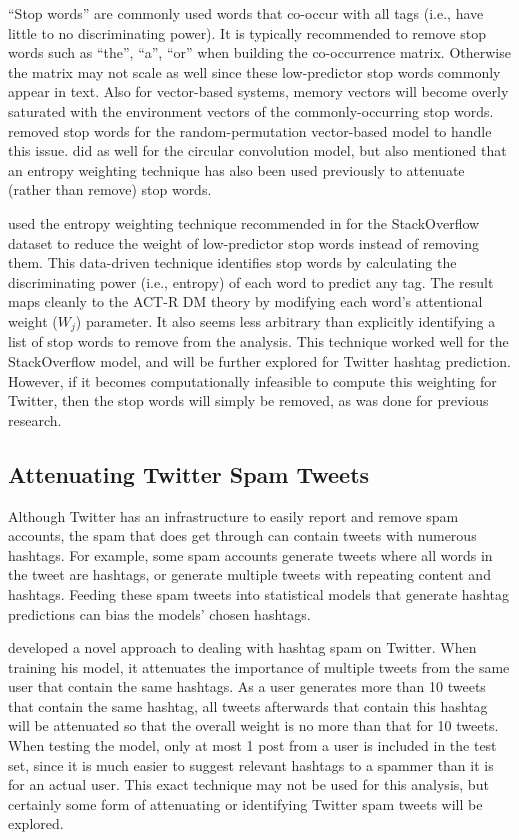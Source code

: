 \documentclass[man,floatsintext,donotrepeattitle]{apa6}
\begin{document}
``Stop words'' are commonly used words that co-occur with all tags (i.e., have little to no discriminating power).
It is typically recommended \parencite{Bird2009} to remove stop words such as ``the'', ``a'', ``or'' when building the co-occurrence matrix.
Otherwise the matrix may not scale as well since these low-predictor stop words commonly appear in text.
Also for vector-based systems, memory vectors will become overly saturated with the environment vectors of the commonly-occurring stop words.
\textcite{Sahlgren2008} removed stop words for the random-permutation vector-based model to handle this issue.
\textcite{Jones2007} did as well for the circular convolution model, but also mentioned that an entropy weighting technique has also been used previously to attenuate (rather than remove) stop words.

\textcite{Stanley2013} used the entropy weighting technique recommended in \textcite{Dumais1991} for the StackOverflow dataset to reduce the weight of low-predictor stop words instead of removing them.
This data-driven technique identifies stop words by calculating the discriminating power (i.e., entropy) of each word to predict any tag.
The result maps cleanly to the ACT-R DM theory by modifying each word's attentional weight ($W_{j}$) parameter.
It also seems less arbitrary than explicitly identifying a list of stop words to remove from the analysis.
This technique worked well for the StackOverflow model, and will be further explored for Twitter hashtag prediction.
However, if it becomes computationally infeasible to compute this weighting for Twitter, then the stop words will simply be removed, as was done for previous research.

\subsection{Attenuating Twitter Spam Tweets}

Although Twitter has an infrastructure to easily report and remove spam accounts, the spam that does get through can contain tweets with numerous hashtags.
For example, some spam accounts generate tweets where all words in the tweet are hashtags, or generate multiple tweets with repeating content and hashtags.
Feeding these spam tweets into statistical models that generate hashtag predictions can bias the models' chosen hashtags.

\textcite{Mazzia2009} developed a novel approach to dealing with hashtag spam on Twitter.
When training his model, it attenuates the importance of multiple tweets from the same user that contain the same hashtags.
As a user generates more than 10 tweets that contain the same hashtag, all tweets afterwards that contain this hashtag will be attenuated so that the overall weight is no more than that for 10 tweets.
When testing the model, only at most 1 post from a user is included in the test set, since it is much easier to suggest relevant hashtags to a spammer than it is for an actual user.
This exact technique may not be used for this analysis, but certainly some form of attenuating or identifying Twitter spam tweets will be explored.
\end{document}
